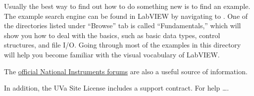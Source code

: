 Usually the best way to find out how to do something new is to find an example.  The example search engine can be found in LabVIEW by navigating to .  One of the directories listed under ``Browse'' tab is called ``Fundamentals,'' which will show you how to deal with the basics, such as basic data types, control structures, and file I/O.  Going through most of the examples in this directory will help you become familiar with the visual vocabulary of LabVIEW.

The \href{http://forums.ni.com/ni/}{official National Instruments forums} are also a useful source of information.

In addition, the UVa Site License includes a support contract.  For help \ldots \FIXME.


